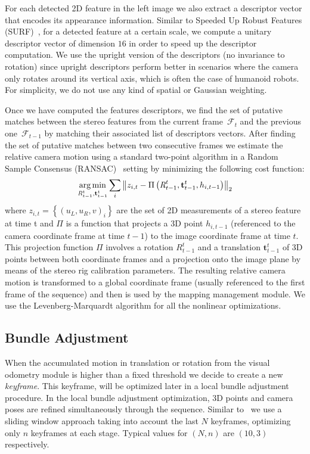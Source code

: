 For each detected 2D feature in the left image we also extract a
descriptor vector that encodes its appearance information. Similar to
Speeded Up Robust Features (SURF)~\cite{Bay08cviu}, for a detected
feature at a certain scale, we compute a unitary descriptor vector of
dimension $16$ in order to speed up the descriptor computation. We use
the upright version of the descriptors (no invariance to rotation)
since upright descriptors perform better in scenarios where the camera
only rotates around its vertical axis, which is often the case of
humanoid robots. For simplicity, we do not use any kind of spatial or
Gaussian weighting.

Once we have computed the features descriptors, we find the set of
putative matches between the stereo features from the current
frame~$\mathcal{F}_{t}$ and the previous one~$\mathcal{F}_{t-1}$ by
matching their associated list of descriptors vectors. After finding
the set of putative matches between two consecutive frames we estimate
the relative camera motion using a standard two-point algorithm in a
Random Sample Consensus (RANSAC)~\cite{Bolles81ijcai} setting by
minimizing the following cost function:
%
\begin{equation} \label{eq:three_pt}
\argmin_{\textit{R}_{t-1}^{t},\mathbf{t}_{t-1}^{t}} \sum\limits_{i} \left\| z_{i,t} - \Pi\left(\textit{R}_{t-1}^{t},\mathbf{t}_{t-1}^{t},h_{i,t-1}\right)\right\|_{2}
\end{equation}
%
where $z_{i,t}=\left\{\left(u_{L},u_{R},v\right)_{i}\right\}$ are the
set of 2D measurements of a stereo feature at time t and $\Pi$ is a
function that projects a 3D point $h_{i,t-1}$ (referenced to the
camera coordinate frame at time $t-1$) to the image coordinate frame
at time $t$. This projection function $\Pi$ involves a rotation
$\textit{R}_{t-1}^{t}$ and a translation $\mathbf{t}_{t-1}^{t}$ of 3D
points between both coordinate frames and a projection onto the image
plane by means of the stereo rig calibration parameters. The resulting
relative camera motion is transformed to a global coordinate frame
(usually referenced to the first frame of the sequence) and then is
used by the mapping management module. We use the Levenberg-Marquardt
algorithm for all the nonlinear optimizations.

\subsection{Bundle Adjustment}\label{sec:ba}
When the accumulated motion in translation or rotation from the visual
odometry module is higher than a fixed threshold we decide to create a
new \textit{keyframe}. This keyframe, will be optimized later in a
local bundle adjustment procedure. In the local bundle adjustment
optimization, 3D points and camera poses are refined simultaneously
through the sequence. Similar to~\cite{Mouragnon09ivc} we use a
sliding window approach taking into account the last $N$ keyframes,
optimizing only $n$ keyframes at each stage. Typical values for
$\left(N,n\right)$ are $\left(10,3\right)$ respectively.

